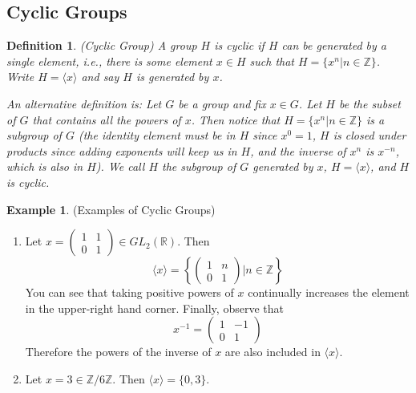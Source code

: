 \documentclass[12pt]{article}
\newtheorem{definition}{Definition}
\theoremstyle{definition}
\newtheorem{example}{Example}
\theoremstyle{definition}
\begin{document}
\subsection{Cyclic Groups}
\begin{definition}(Cyclic Group)
A group $H$ is cyclic if $H$ can be generated by a single element, i.e., there is some element $x \in H$ such that $H = \{x^n | n \in \mathbb{Z} \}$. Write $H  = \langle x \rangle$ and say $H$ is generated by $x$.

An alternative definition is: Let $G$ be a group and fix $x \in G$. Let $H$ be the subset of $G$ that contains all the powers of $x$. Then notice that $H = \{x^n | n \in \mathbb{Z} \}$ is a subgroup of $G$ (the identity element must be in $H$ since $x^0 = 1$, $H$ is closed under products since adding exponents will keep us in $H$, and the inverse of $x^n$ is $x^{-n}$, which is also in $H$). We call $H$ the subgroup of $G$ generated by $x$, $H = \langle x \rangle$, and $H$ is cyclic.  
\end{definition}

\begin{example}(Examples of Cyclic Groups)
\begin{enumerate}
	\item Let $x = \begin{pmatrix} 1 & 1 \\ 0 & 1 \end{pmatrix} \in GL_2(\mathbb{R})$. Then
	\begin{equation}
		\langle x \rangle = \left\{ \begin{pmatrix} 1 & n \\ 0 & 1 \end{pmatrix} \Big\vert n \in \mathbb{Z} \right\}
	\end{equation}
	You can see that taking positive powers of $x$ continually increases the element in the upper-right hand corner. Finally, observe that 
	\begin{equation}
		x^{-1} = \begin{pmatrix} 1 & -1 \\ 0 & 1 \end{pmatrix}
	\end{equation}
	Therefore the powers of the inverse of $x$ are also included in $\langle x \rangle$.
	\item Let $x = 3 \in \mathbb{Z} / 6 \mathbb{Z}$. Then $\langle x \rangle = \{ 0, 3 \}$.
\end{enumerate}
\end{example}
\end{document}
